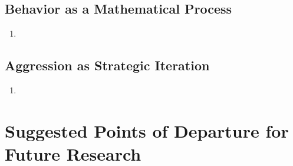 \documentclass[12pt]{article}
\begin{document}
\subsection{Behavior as a Mathematical Process}
\begin{enumerate}
    \item 
\end{enumerate}
\subsection{Aggression as Strategic Iteration}
\begin{enumerate}
    \item 
\end{enumerate}

\section{Suggested Points of Departure for Future Research}
\end{document}
